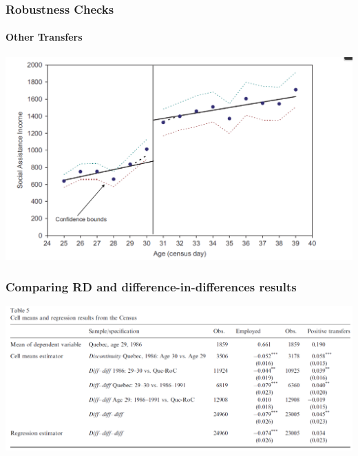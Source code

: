 \documentclass{beamer}
\begin{document}

\begin{frame}
\frametitle{Robustness Checks}
\framesubtitle{Other Transfers}

\begin{center}
	
	\includegraphics[width=1\linewidth]{fig_6.PNG}
	
\end{center}

\end{frame}




\begin{frame}
\frametitle{Comparing RD and difference-in-differences results}

\begin{center}
	
	\includegraphics[width=1\linewidth]{table_5.PNG}
	
\end{center}

\end{frame}
\end{document}
